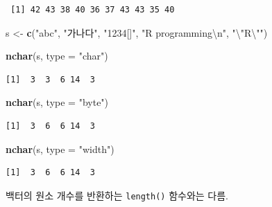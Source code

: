 \documentclass[
  11pt,
]{krantz}
\makeatletter
\newenvironment{Shaded}{\begin{snugshade}}{\end{snugshade}}
\newcommand{\CharTok}[1]{\textcolor[rgb]{0.5,0.5,0.5}{#1}}
\newcommand{\DataTypeTok}[1]{\textcolor[rgb]{0.27,0.27,0.27}{#1}}
\newcommand{\KeywordTok}[1]{\textcolor[rgb]{0.27,0.27,0.27}{\textbf{#1}}}
\newcommand{\NormalTok}[1]{#1}
\newcommand{\StringTok}[1]{\textcolor[rgb]{0.5,0.5,0.5}{#1}}
\newenvironment{kframe}{%
\medskip{}
\setlength{\fboxsep}{.8em}
 \def\at@end@of@kframe{}%
 \ifinner\ifhmode%
  \def\at@end@of@kframe{\end{minipage}}%
  \begin{minipage}{\columnwidth}%
 \fi\fi%
 \def\FrameCommand##1{\hskip\@totalleftmargin \hskip-\fboxsep
 \colorbox{shadecolor}{##1}\hskip-\fboxsep
     \hskip-\linewidth \hskip-\@totalleftmargin \hskip\columnwidth}%
 \MakeFramed {\advance\hsize-\width
   \@totalleftmargin\z@ \linewidth\hsize
   \@setminipage}}%
 {\par\unskip\endMakeFramed%
 \at@end@of@kframe}
\newenvironment{rmdblock}[1]
  {
  \begin{itemize}
  \renewcommand{\labelitemi}{
    \raisebox{-.7\height}[0pt][0pt]{
      {\setkeys{Gin}{width=3em,keepaspectratio}\texttt{[image: images/\#1]}}
    }
  }
  \setlength{\fboxsep}{1em}
  \begin{kframe}
  \item
  }
  {
  \end{kframe}
  \end{itemize}
  }
\newenvironment{rmdwarning}
  {\begin{rmdblock}{warning}}
  {\end{rmdblock}}
\makeatother
\begin{document}
\begin{verbatim}
 [1] 42 43 38 40 36 37 43 43 35 40
\end{verbatim}

\begin{Shaded}
\begin{Highlighting}[]
\NormalTok{s <-}\StringTok{ }\KeywordTok{c}\NormalTok{(}\StringTok{"abc"}\NormalTok{, }\StringTok{"가나다"}\NormalTok{, }\StringTok{"1234[]"}\NormalTok{, }\StringTok{"R programming}\CharTok{\textbackslash{}n}\StringTok{"}\NormalTok{, }\StringTok{"}\CharTok{\textbackslash{}"}\StringTok{R}\CharTok{\textbackslash{}"}\StringTok{"}\NormalTok{)}

\KeywordTok{nchar}\NormalTok{(s, }\DataTypeTok{type =} \StringTok{"char"}\NormalTok{)}
\end{Highlighting}
\end{Shaded}

\begin{verbatim}
[1]  3  3  6 14  3
\end{verbatim}

\begin{Shaded}
\begin{Highlighting}[]
\KeywordTok{nchar}\NormalTok{(s, }\DataTypeTok{type =} \StringTok{"byte"}\NormalTok{)}
\end{Highlighting}
\end{Shaded}

\begin{verbatim}
[1]  3  6  6 14  3
\end{verbatim}

\begin{Shaded}
\begin{Highlighting}[]
\KeywordTok{nchar}\NormalTok{(s, }\DataTypeTok{type =} \StringTok{"width"}\NormalTok{)}
\end{Highlighting}
\end{Shaded}

\begin{verbatim}
[1]  3  6  6 14  3
\end{verbatim}

\normalsize

\footnotesize

\begin{rmdwarning}
\begin{rmdwarning}

백터의 원소 개수를 반환하는 \texttt{length()} 함수와는 다름.

\end{rmdwarning}
\end{rmdwarning}
\end{document}
